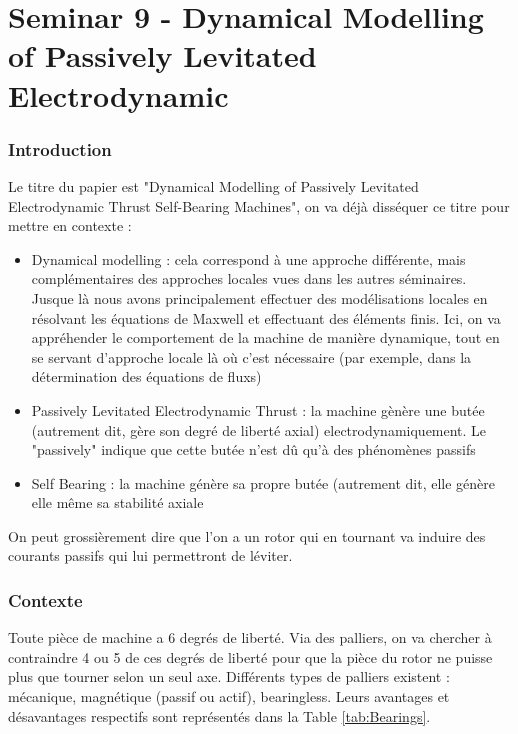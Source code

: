 \part{Seminar 9 - Dynamical Modelling of Passively Levitated Electrodynamic}


\section{Introduction}
Le titre du papier est "Dynamical Modelling of Passively Levitated Electrodynamic Thrust Self-Bearing Machines", on va déjà disséquer ce titre pour mettre en contexte :
\begin{itemize}
    \item Dynamical modelling : cela correspond à une approche différente, mais complémentaires des approches locales vues dans les autres séminaires. Jusque là nous avons principalement effectuer des modélisations locales en résolvant les équations de Maxwell et effectuant des éléments finis. Ici, on va appréhender le comportement de la machine de manière dynamique, tout en se servant d'approche locale là où c'est nécessaire (par exemple, dans la détermination des équations de fluxs)
    \item Passively Levitated Electrodynamic Thrust : la machine gènère une butée (autrement dit, gère son degré de liberté axial) electrodynamiquement. Le "passively" indique que cette butée n'est dû qu'à des phénomènes passifs
    \item Self Bearing : la machine génère sa propre butée (autrement dit, elle génère elle même sa stabilité axiale
\end{itemize}

On peut grossièrement dire que l'on a un rotor qui en tournant va induire des courants passifs qui lui permettront de léviter.

\section{Contexte}
Toute pièce de machine a 6 degrés de liberté. Via des palliers, on va chercher à contraindre 4 ou 5 de ces degrés de liberté pour que la pièce du rotor ne puisse plus que tourner selon un seul axe. Différents types de palliers existent : mécanique, magnétique (passif ou actif), bearingless. Leurs avantages et désavantages respectifs sont représentés dans la Table \ref{tab:Bearings}.


